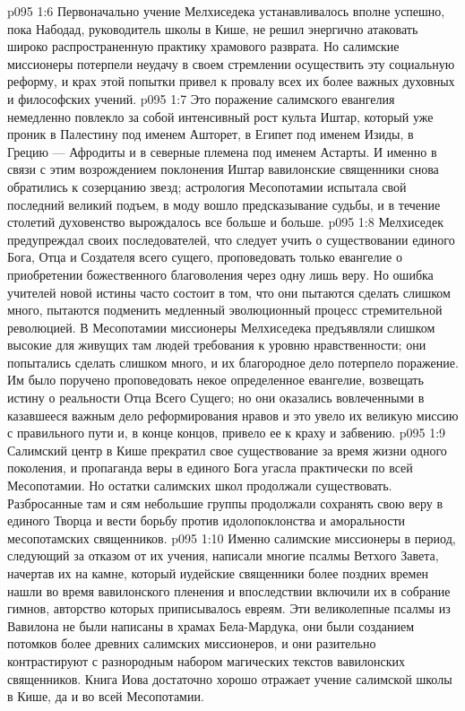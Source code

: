 \vs p095 1:6 \pc Первоначально учение Мелхиседека устанавливалось вполне успешно, пока Набодад, руководитель школы в Кише, не решил энергично атаковать широко распространенную практику храмового разврата. Но салимские миссионеры потерпели неудачу в своем стремлении осуществить эту социальную реформу, и крах этой попытки привел к провалу всех их более важных духовных и философских учений.
\vs p095 1:7 Это поражение салимского евангелия немедленно повлекло за собой интенсивный рост культа Иштар, который уже проник в Палестину под именем Ашторет, в Египет под именем Изиды, в Грецию --- Афродиты и в северные племена под именем Астарты. И именно в связи с этим возрождением поклонения Иштар вавилонские священники снова обратились к созерцанию звезд; астрология Месопотамии испытала свой последний великий подъем, в моду вошло предсказывание судьбы, и в течение столетий духовенство вырождалось все больше и больше.
\vs p095 1:8 Мелхиседек предупреждал своих последователей, что следует учить о существовании единого Бога, Отца и Создателя всего сущего, проповедовать только евангелие о приобретении божественного благоволения через одну лишь веру. Но ошибка учителей новой истины часто состоит в том, что они пытаются сделать слишком много, пытаются подменить медленный эволюционный процесс стремительной революцией. В Месопотамии миссионеры Мелхиседека предъявляли слишком высокие для живущих там людей требования к уровню нравственности; они попытались сделать слишком много, и их благородное дело потерпело поражение. Им было поручено проповедовать некое определенное евангелие, возвещать истину о реальности Отца Всего Сущего; но они оказались вовлеченными в казавшееся важным дело реформирования нравов и это увело их великую миссию с правильного пути и, в конце концов, привело ее к краху и забвению.
\vs p095 1:9 Салимский центр в Кише прекратил свое существование за время жизни одного поколения, и пропаганда веры в единого Бога угасла практически по всей Месопотамии. Но остатки салимских школ продолжали существовать. Разбросанные там и сям небольшие группы продолжали сохранять свою веру в единого Творца и вести борьбу против идолопоклонства и аморальности месопотамских священников.
\vs p095 1:10 \pc Именно салимские миссионеры в период, следующий за отказом от их учения, написали многие псалмы Ветхого Завета, начертав их на камне, который иудейские священники более поздних времен нашли во время вавилонского пленения и впоследствии включили их в собрание гимнов, авторство которых приписывалось евреям. Эти великолепные псалмы из Вавилона не были написаны в храмах Бела\hyp{}Мардука, они были созданием потомков более древних салимских миссионеров, и они разительно контрастируют с разнородным набором магических текстов вавилонских священников. Книга Иова достаточно хорошо отражает учение салимской школы в Кише, да и во всей Месопотамии.
